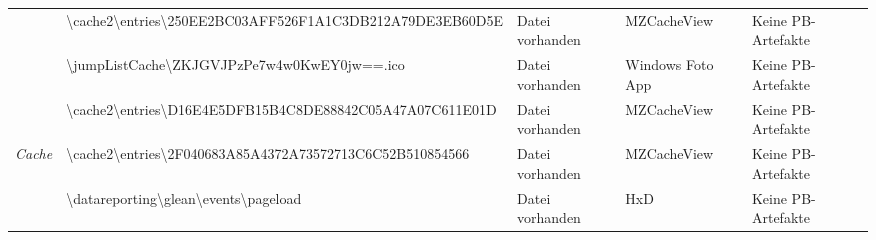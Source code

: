 \begin{appendices}
{\begin{landscape}
\begin{table}[h!]
{\begin{tabular}{cllll}
	\multicolumn{1}{|c|}{}                                                                                       & \multicolumn{1}{l|}{\cellcolor[HTML]{34CDF9}\textbackslash{}cache2\textbackslash{}entries\textbackslash{}250EE2BC03AFF526F1A1C3DB212A79DE3EB60D5E}                                                                  & \multicolumn{1}{l|}{\cellcolor[HTML]{009901}Datei vorhanden}                                      & \multicolumn{1}{l|}{MZCacheView}            & \multicolumn{1}{l|}{\cellcolor[HTML]{F8A102}Keine PB-Artefakte} \\ \cline{2-5} 
	\multicolumn{1}{|c|}{}                                                                                       & \multicolumn{1}{l|}{\cellcolor[HTML]{34CDF9}\textbackslash{}jumpListCache\textbackslash{}ZKJGVJPzPe7w4w0KwEY0jw==.ico}                                                                                              & \multicolumn{1}{l|}{\cellcolor[HTML]{009901}Datei vorhanden}                                      & \multicolumn{1}{l|}{Windows Foto App}            & \multicolumn{1}{l|}{\cellcolor[HTML]{F8A102}Keine PB-Artefakte} \\ \cline{2-5} 
	\multicolumn{1}{|c|}{}                                                                                       & \multicolumn{1}{l|}{\cellcolor[HTML]{34CDF9}\textbackslash{}cache2\textbackslash{}entries\textbackslash{}D16E4E5DFB15B4C8DE88842C05A47A07C611E01D}                                                                  & \multicolumn{1}{l|}{\cellcolor[HTML]{009901}Datei vorhanden}                                      & \multicolumn{1}{l|}{MZCacheView}            & \multicolumn{1}{l|}{\cellcolor[HTML]{F8A102}Keine PB-Artefakte} \\ \cline{2-5} 
	\multicolumn{1}{|c|}{\multirow{-6}{*}{\textit{Cache}}}                                                       & \multicolumn{1}{l|}{\cellcolor[HTML]{34CDF9}\textbackslash{}cache2\textbackslash{}entries\textbackslash{}2F040683A85A4372A73572713C6C52B510854566}                                                                  & \multicolumn{1}{l|}{\cellcolor[HTML]{009901}Datei vorhanden}                                      & \multicolumn{1}{l|}{MZCacheView}            & \multicolumn{1}{l|}{\cellcolor[HTML]{F8A102}Keine PB-Artefakte} \\ \hline
	\multicolumn{1}{|c|}{}                                                                                       & \multicolumn{1}{l|}{\cellcolor[HTML]{3190FF}\textbackslash{}datareporting\textbackslash{}glean\textbackslash{}events\textbackslash{}pageload}                                                                       & \multicolumn{1}{l|}{\cellcolor[HTML]{009901}Datei vorhanden}                                      & \multicolumn{1}{l|}{HxD}                         & \multicolumn{1}{l|}{\cellcolor[HTML]{F8A102}Keine PB-Artefakte} \\ \cline{2-5} 

\end{tabular}}
\end{table}
\end{landscape}}
\end{appendices}
